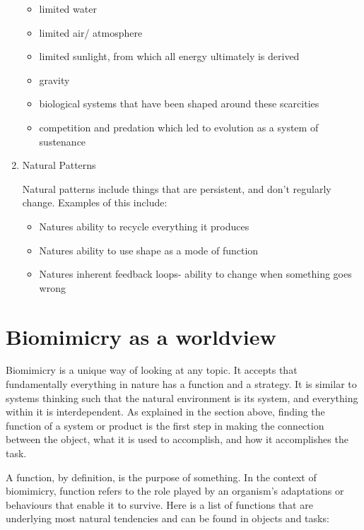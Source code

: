\begin{enumerate}
\begin{itemize}
  \item limited water
  \item limited air/ atmosphere
  \item limited sunlight, from which all energy ultimately is derived
  \item gravity
  \item biological systems that have been shaped around these scarcities
  \item competition and predation which led to evolution as a system of sustenance
\end{itemize}

\item Natural Patterns

Natural patterns include things that are persistent, and don't regularly change. Examples of this include:
\begin{itemize}
  \item Natures ability to recycle everything it produces
  \item Natures ability to use shape as a mode of function
  \item Natures inherent feedback loops- ability to change when something goes wrong
\end {itemize}

\end{enumerate}

\section{Biomimicry as a worldview}

Biomimicry is a unique way of looking at any topic. It accepts that fundamentally everything in nature has a function and a strategy. It is similar to systems thinking such that the natural environment is its system, and everything within it is interdependent. As explained in the section above, finding the function of a system or product is the first step in making the connection between the object, what it is used to accomplish, and how it accomplishes the task. 
	
A function, by definition, is the purpose of something. In the context of biomimicry, function refers to the role played by an organism's adaptations or behaviours that enable it to survive. Here is a list of functions that are underlying most natural tendencies and can be found in objects and tasks:

